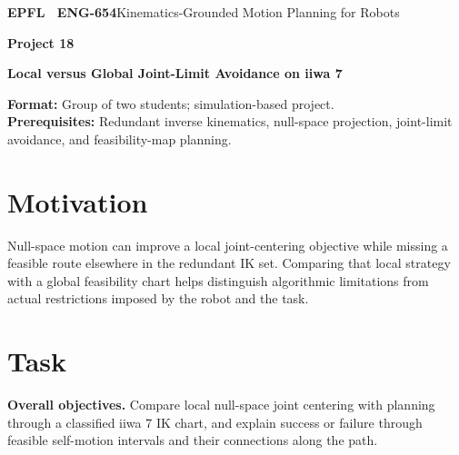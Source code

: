 \documentclass[11pt,a4paper]{article}
\begin{document}
{\small\textbf{EPFL \textbar\ ENG-654}\hfill Kinematics-Grounded Motion Planning for Robots}
\vspace{5mm}

{\color{epflred}\Large\bfseries Project 18}

{\LARGE\bfseries Local versus Global Joint-Limit Avoidance on iiwa 7\par}

\textbf{Format:} Group of two students; simulation-based project.\\
\textbf{Prerequisites:} Redundant inverse kinematics, null-space projection, joint-limit avoidance, and feasibility-map planning.

\section*{Motivation}
Null-space motion can improve a local joint-centering objective while
missing a feasible route elsewhere in the redundant IK set. Comparing that
local strategy with a global feasibility chart helps distinguish algorithmic
limitations from actual restrictions imposed by the robot and the task.

\section*{Task}
\textbf{Overall objectives.} Compare local null-space joint centering with planning through a
classified iiwa 7 IK chart, and explain success or failure through feasible
self-motion intervals and their connections along the path.
\end{document}
